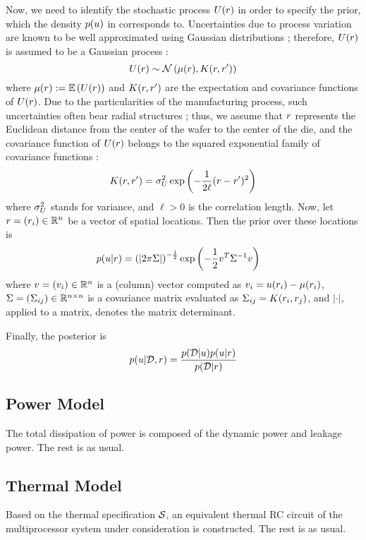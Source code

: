 Now, we need to identify the stochastic process $U(r)$ in order to specify the prior, which the density $\f{\u}$ in  corresponds to. Uncertainties due to process variation are known to be well approximated using Gaussian distributions \cite{srivastava2010}; therefore, $U(r)$ is assumed to be a Gaussian process \cite{rasmussen2006}:
\[
  \U(\r) \sim \gaussianp{\fMean{\r}}{\fCov{\r, \r'}}
\]
where $\fMean{\r} := \E{\U(\r)}$ and $\fCov{\r, \r'}$ are the expectation and covariance functions of $U(r)$. Due to the particularities of the manufacturing process, such uncertainties often bear radial structures \cite{cheng2011}; thus, we assume that $r$ represents the Euclidean distance from the center of the wafer to the center of the die, and the covariance function of $U(r)$ belongs to the squared exponential family of covariance functions \cite{rasmussen2006}:
\begin{equation} \elabel{covariance-function}
  \fCov{\r, \r'} = \sigma^2_\U \exp\left(-\frac{1}{2 \ell}(\r - \r')^2\right)
\end{equation}
where $\sigma^2_U$ stands for variance, and $\ell > 0$ is the correlation length. Now, let $r = (r_i) \in \mathbb{R}^n$ be a vector of spatial locations. Then the prior over these locations is
\begin{align*}
  \f{\u | \r} & = \left(|2 \pi \mCov|\right)^{-\frac{1}{2}} \exp\left(-\frac{1}{2} v^T \mCov^{-1} v \right)
\end{align*}
where $v = (v_i) \in \mathbb{R}^n$ is a (column) vector computed as $v_i = \u(\r_i) - \fMean{\r_i}$, $\Sigma = (\Sigma_{ij}) \in \mathbb{R}^{n \times n}$ is a covariance matrix evaluated as $\mCov_{ij} = \fCov{\r_i, \r_j}$, and $|\cdot|$, applied to a matrix, denotes the matrix determinant.

Finally, the posterior is
\begin{align*}
  \f{\u | \data, \r} = \frac{\f{\data | \u} \f{\u | \r}}{\f{\data | \r}}
\end{align*}

\subsection{Power Model}
The total dissipation of power is composed of the dynamic power and leakage power. The rest is as usual.

\subsection{Thermal Model}
Based on the thermal specification $\mathcal{S}$, an equivalent thermal RC circuit of the multiprocessor system under consideration is constructed. The rest is as usual.
